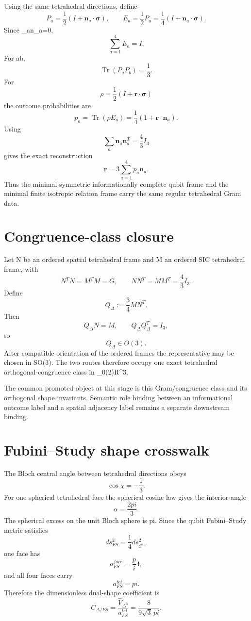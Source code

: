 \documentclass[11pt,a4paper,twoside]{book}
\def\({}%
\def\){}%
\def\pi{pi}%
\theoremstyle{definition}
\begin{document}
Using the same tetrahedral directions, define
\[
P_a=\frac12(I+\mathbf n_a\cdot\boldsymbol\sigma),
\qquad
E_a=\frac12P_a
=\frac14(I+\mathbf n_a\cdot\boldsymbol\sigma).
\]
Since \(\sum_a\mathbf n_a=0\),
\[
\boxed{\sum_{a=1}^{4}E_a=I}.
\]
For \(a\neq b\),
\[
\boxed{\operatorname{Tr}(P_aP_b)=\frac13}.
\]
For
\[
\rho=\frac12(I+\mathbf r\cdot\boldsymbol\sigma)
\]
the outcome probabilities are
\[
p_a=\operatorname{Tr}(\rho E_a)
=\frac14(1+\mathbf r\cdot\mathbf n_a).
\]
Using
\[
\sum_a\mathbf n_a\mathbf n_a^T=\frac43I_3
\]
gives the exact reconstruction
\[
\boxed{
\mathbf r
=
3\sum_{a=1}^{4}p_a\mathbf n_a.
}
\]
Thus the minimal symmetric informationally complete qubit frame and the minimal
finite isotropic relation frame carry the same regular tetrahedral Gram data.

\section{Congruence-class closure}

Let \(N\) be an ordered spatial tetrahedral frame and \(M\) an ordered SIC
tetrahedral frame, with
\[
N^TN=M^TM=G,
\qquad
NN^T=MM^T=\frac43I_3.
\]
Define
\[
\boxed{Q_{\Delta}:=\frac34MN^T.}
\]
Then
\[
Q_{\Delta}N=M,
\qquad
Q_{\Delta}Q_{\Delta}^T=I_3,
\]
so
\[
\boxed{Q_{\Delta}\in O(3).}
\]
After compatible orientation of the ordered frames the representative may be
chosen in \(SO(3)\).  The two routes therefore occupy one exact tetrahedral
orthogonal-congruence class in
\(_0(2)\cong\mathbb R^3\).

The common promoted object at this stage is this Gram/congruence class and its
orthogonal shape invariants.  Semantic role binding between an informational
outcome label and a spatial adjacency label remains a separate downstream
binding.

\section{Fubini--Study shape crosswalk}

The Bloch central angle between tetrahedral directions obeys
\[
\cos\chi=-\frac13.
\]
For one spherical tetrahedral face the spherical cosine law gives the interior
angle
\[
\alpha=\frac{2\pi}{3}.
\]
The spherical excess on the unit Bloch sphere is \(\pi\).  Since the qubit
Fubini--Study metric satisfies
\[
ds_{FS}^2=\frac14ds_{S^2}^2,
\]
one face has
\[
\boxed{a_{FS}^{face}=\frac\pi4},
\]
and all four faces carry
\[
\boxed{a_{FS}^{tet}=\pi}.
\]
Therefore the dimensionless dual-shape coefficient is
\[
\boxed{
C_{\Delta/FS}
=
\frac{\hat V_{\Delta^3}}{a_{FS}^{tet}}
=
\frac{8}{9\sqrt3\,\pi}.
}
\]
\end{document}

